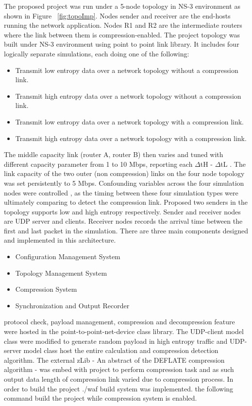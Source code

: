 \documentclass[sigconf]{acmart}
\begin{document}
The proposed project was run under a 5-node topology in NS-3 environment as shown in Figure ~\ref{fig:topoImp}. Nodes sender and receiver are the end-hosts running the network application. Nodes R1 and R2 are the intermediate routers where the link between them is compression-enabled. The project topology was built under NS-3 environment using point to point link library. It includes four logically separate simulations, each doing one of the following: 
\begin{itemize}
\item Transmit low entropy data over a network topology without a compression link.
\item Transmit high entropy data over a network topology without a compression link. 
\item Transmit low entropy data over a network topology with a compression link. 
\item Transmit high entropy data over a network topology with a compression link.
\end{itemize}

The middle capacity link (router A, router B) then varies and tuned with different capacity parameter from 1 to 10 Mbps, reporting each $\Delta$tH - $\Delta$tL . The link capacity of the two outer (non compression) links on the four node topology was set persistently to 5 Mbps.  Confounding variables across the four simulation nodes were controlled , as the timing between these four simulation types were ultimately comparing to detect the compression link. Proposed two senders in the topology supports low and high entropy respectively. Sender and receiver nodes are UDP server and clients. Receiver nodes records the arrival time between the first and last packet in the simulation. There are three main components designed and implemented in this architecture.  

\begin{itemize}
\item Configuration Management System
\item Topology Management System
\item Compression System
\item Synchronization and Output Recorder
\end{itemize}

protocol check, payload management, compression and decompression feature were hosted in the point-to-point-net-device class library. The UDP-client model class were modified to generate random payload in high entropy traffic and UDP-server model class host the entire calculation and compression detection algorithm. The external zLib \cite{Deutsch:1996:ZCD:RFC1950} - An abstract of the DEFLATE compression algorithm - was embed with project to perform compression task and as such output data length of compression link varied due to compression process.  
In order to build the project ./waf build system was implemented. the following command build the project while compression system is enabled. 
 
\end{document}
